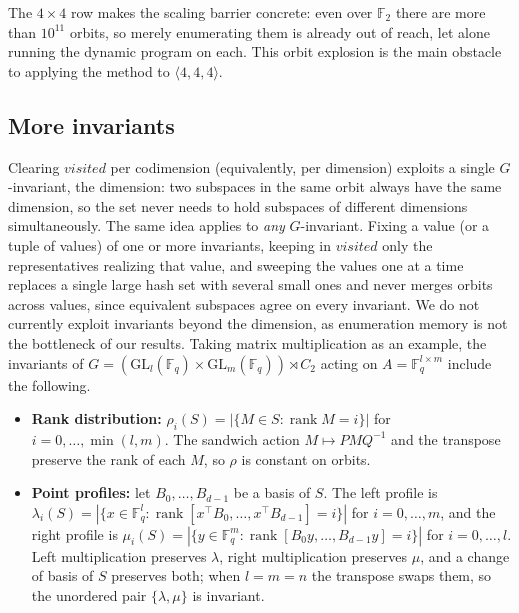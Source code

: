 \documentclass[11pt]{article}
\theoremstyle{definition}
\newcommand{\F}{\mathbb{F}}
\newcommand{\GL}{\mathrm{GL}}
\newcommand{\rank}{\operatorname{rank}}
\newcommand{\mmt}[3]{\langle #1,#2,#3\rangle}
\begin{document}
The $4\times 4$ row makes the scaling barrier concrete: even over $\F_2$ there are
more than $10^{11}$ orbits, so merely enumerating them is already out of reach, let
alone running the dynamic program on each. This orbit explosion
is the main obstacle to applying the method to $\mmt{4}{4}{4}$.

\subsection*{More invariants}\label{app:invariants}

Clearing $\textit{visited}$ per codimension (equivalently, per dimension) exploits a single $G$-invariant, the
dimension: two subspaces in the same orbit always have the same
dimension, so the set never needs to hold subspaces of different dimensions
simultaneously. The same idea applies to \emph{any} $G$-invariant. Fixing a value
(or a tuple of values) of one or more invariants, keeping in $\textit{visited}$
only the representatives realizing that value, and sweeping the values one at a
time replaces a single large hash set with several small ones and never merges
orbits across values, since equivalent subspaces agree on every invariant. We do
not currently exploit invariants beyond the dimension, as enumeration memory is
not the bottleneck of our results. Taking matrix multiplication as an example,
the invariants of $G=(\GL_l(\F_q)\times\GL_m(\F_q))\rtimes C_2$ acting on
$A=\F_q^{l\times m}$ include the following.

\begin{itemize}
  \item \textbf{Rank distribution:} $\rho_i(S)=|\{M\in S:\rank M=i\}|$ for
    $i=0,\dots,\min(l,m)$. The sandwich action $M\mapsto PMQ^{-1}$ and the
    transpose preserve the rank of each $M$, so $\rho$ is constant on orbits.
  \item \textbf{Point profiles:} let $B_0,\dots,B_{d-1}$ be a basis of $S$.
    The left profile is
    $\lambda_i(S)=|\{x\in\F_q^{l}:\rank[x^\top B_0,\dots,x^\top B_{d-1}]=i\}|$ for
    $i=0,\dots,m$, and the right profile is
    $\mu_i(S)=|\{y\in\F_q^{m}:\rank[B_0y,\dots,B_{d-1}y]=i\}|$ for $i=0,\dots,l$.
    Left multiplication preserves $\lambda$, right multiplication preserves $\mu$,
    and a change of basis of $S$ preserves both; when $l=m=n$ the transpose swaps
    them, so the unordered pair $\{\lambda,\mu\}$ is invariant.
\end{itemize}
\end{document}
